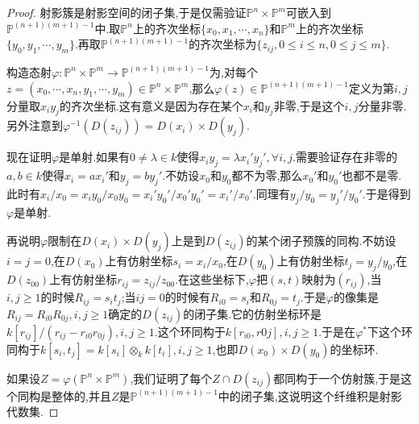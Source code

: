 \begin{enumerate}
\begin{enumerate}
\begin{proof}
			射影簇是射影空间的闭子集,于是仅需验证$\mathbb{P}^n\times\mathbb{P}^m$可嵌入到$\mathbb{P}^{(n+1)(m+1)-1}$中.取$\mathbb{P}^n$上的齐次坐标$\{x_0,x_1,\cdots,x_n\}$和$\mathbb{P}^m$上的齐次坐标$\{y_0,y_1,\cdots,y_m\}$.再取$\mathbb{P}^{(n+1)(m+1)-1}$的齐次坐标为$\{z_{ij},0\le i\le n,0\le j\le m\}$.
			
			构造态射$\varphi:\mathbb{P}^n\times\mathbb{P}^m\to\mathbb{P}^{(n+1)(m+1)-1}$为,对每个$z=(x_0,\cdots,x_n,y_1,\cdots,y_m)\in\mathbb{P}^n\times\mathbb{P}^m$,那么$\varphi(z)\in\mathbb{P}^{(n+1)(m+1)-1}$定义为第$i,j$分量取$x_iy_j$的齐次坐标.这有意义是因为存在某个$x_i$和$y_j$非零,于是这个$i,j$分量非零.另外注意到$\varphi^{-1}(D(z_{ij}))=D(x_i)\times D(y_j)$.
			
			现在证明$\varphi$是单射.如果有$0\not=\lambda\in k$使得$x_iy_j=\lambda x_i'y_j',\forall i,j$.需要验证存在非零的$a,b\in k$使得$x_i=ax_i'$和$y_j=by_j'$.不妨设$x_0$和$y_0$都不为零,那么$x_0'$和$y_0'$也都不是零.此时有$x_i/x_0=x_iy_0/x_0y_0=x_i'y_0'/x_0'y_0'=x_i'/x_0'$.同理有$y_j/y_0=y_j'/y_0'$.于是得到$\varphi$是单射.
			
			再说明$\varphi$限制在$D(x_i)\times D(y_j)$上是到$D(z_{ij})$的某个闭子预簇的同构.不妨设$i=j=0$,在$D(x_0)$上有仿射坐标$s_i=x_i/x_0$,在$D(y_0)$上有仿射坐标$t_j=y_j/y_0$,在$D(z_{00})$上有仿射坐标$r_{ij}=z_{ij}/z_{00}$.在这些坐标下,$\varphi$把$(s,t)$映射为$(r_{ij})$,当$i,j\ge1$的时候$R_{ij}=s_it_j$;当$ij=0$的时候有$R_{i0}=s_i$和$R_{0j}=t_j$.于是$\varphi$的像集是$R_{ij}=R_{i0}R_{0j},i,j\ge1$确定的$D(z_{ij})$的闭子集.它的仿射坐标环是$k[r_{ij}]/(r_{ij}-r_{i0}r_{0j}),i,j\ge1$.这个环同构于$k[r_{i0},r{0j}],i,j\ge1$.于是在$\varphi^*$下这个环同构于$k[s_i,t_j]=k[s_i]\otimes_kk[t_i],i,j\ge1$,也即$D(x_0)\times D(y_0)$的坐标环.
			
			如果设$Z=\varphi(\mathbb{P}^n\times\mathbb{P}^m)$,我们证明了每个$Z\cap D(z_{ij})$都同构于一个仿射簇,于是这个同构是整体的,并且$Z$是$\mathbb{P}^{(n+1)(m+1)-1}$中的闭子集,这说明这个纤维积是射影代数集.
			

\end{proof}
\end{enumerate}
\end{enumerate}
